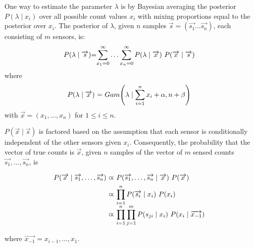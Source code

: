 One way to estimate the parameter $\lambda$ is by Bayesian averaging the posterior  $P(\lambda \mid x_i)$ over all possible count values $x_i$ with mixing proportions equal to the posterior over $x_i$. The posterior of $\lambda$, given $n$ samples $\overrightarrow{s}=(\overrightarrow{s_1} \dots \overrightarrow{s_n})$, each consisting of $m$ sensors, is:
\begin{equation}
	\label{eq:marginal_occurrences}
	\begin{tabular}{r@{=}l}
		$P(\lambda \mid \overrightarrow{s})$ &  $\displaystyle\sum_{x_1=0}^{\infty} \ldots \displaystyle\sum_{x_n=0}^{\infty} P(\lambda \mid \overrightarrow{x}) ~ P(\overrightarrow{x} \mid \overrightarrow{s})$ \\
	\end{tabular}
\end{equation}
\noindent where
\begin{equation*}
	\begin{tabular}{r@{ = }l}
		$P(\lambda \mid \overrightarrow{x})$ & $Gam\Bigg(\lambda \mid \displaystyle\sum_{i=1}^{n} x_i + \alpha, n + \beta \Bigg)$
	\end{tabular}
\end{equation*}
\noindent with $\overrightarrow{x} = (x_1, \ldots, x_n)$ for $1 \leq i \leq n$.

$P(\overrightarrow{x} \mid \overrightarrow{s})$ is factored based on the assumption that each sensor is conditionally independent of the other sensors given $x_i$. Consequently, the probability that the vector of true counts is $\overrightarrow{x}$, given $n$ samples of the vector of $m$ sensed counts $\overrightarrow{s_1}, \ldots, \overrightarrow{s_n}$, is

\begin{equation}
    \label{eq:occurrences_likelihood}
    \begin{tabular}{r@{ $\varpropto$ }l}
        $P(\overrightarrow{x} \mid \overrightarrow{s_1}, \ldots, \overrightarrow{s_n})$ & $P(\overrightarrow{s_1}, \ldots, \overrightarrow{s_n} \mid \overrightarrow{x}) ~ P(\overrightarrow{x})$ \\ [1ex]
        & $\displaystyle\prod_{i=1}^{n} P(\overrightarrow{s_i} \mid x_i) ~ P(x_i)$ \\ [2ex]
        & $\displaystyle\prod_{i=1}^{n} \displaystyle\prod_{j=1}^{m} P(s_{ji} \mid x_i) ~ P(x_i \mid \overrightarrow{x_{-1}})$
    \end{tabular}
\end{equation}

\noindent where $\overrightarrow{x_{-1}} = x_{i-1}, \ldots, x_1$.

